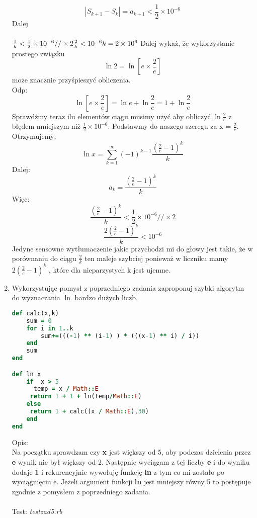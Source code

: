 \documentclass[fleqn]{article}
\begin{document}
\begin{enumerate}
   \[|S_{k+1} - S_{k}| = a_{k+1} < \frac{1}{2}\times 10^{-6}\]
   Dalej \\ \\ 
   $
   \frac{1}{k} <  \frac{1}{2}\times 10^{-6} // \times 2 \newline \newline
   \frac{2}{k} <  10^{-6} \\ \\
   k = 2 \times 10^{6} \\ \\
   $
   Dalej wykaż, że wykorzystanie prostego związku \[\ln 2 = \ln[e\times\frac{2}{e}]\] może znacznie przyśpieszyć obliczenia.
   \\Odp:
   \\
   \[\ln[e\times\frac{2}{e}] = \ln e + \ln \frac{2}{e} = 1 + \ln \frac{2}{e}\]
   Sprawdźmy teraz ilu elementów ciągu musimy użyć aby obliczyć $ \ln \frac{2}{e} $ z błędem mniejszym niż $\frac{1}{2}\times 10^{-6} $.
   Podstawmy do naszego szeregu za x = $ \frac{2}{e}  $. Otrzymujemy:\\
   \[\ln x = \sum_{k=1}^\infty(-1)^{k-1}\frac{(\frac{2}{e}-1)^k}{k}
\]
 Dalej:
 \[a_{k} = \frac{(\frac{2}{e}-1)^k}{k}\]
 Więc:
 \[ \frac{(\frac{2}{e}-1)^k}{k}< \frac{1}{2}\times 10^{-6} // \times 2\]
 \[ \frac{2(\frac{2}{e}-1)^k}{k}<10^{-6}\]
 Jedyne sensowne wytłumaczenie jakie przychodzi mi do głowy jest takie, że w porównaniu do ciągu  $ \frac{2}{k} $ ten maleje szybciej ponieważ w liczniku mamy $  2(\frac{2}{e}-1)^k $ , które dla nieparzystych k jest ujemne.
 \item Wykorzystując pomysł z poprzedniego zadania zaproponuj szybki algorytm do wyznaczania $ \ln $ bardzo dużych liczb.\\
 \begin{lstlisting}[language=Ruby, caption=Algorytm do wyznacznia logarytmu naturalnego]
def calc(x,k)
    sum = 0 
    for i in 1..k 
        sum+=(((-1) ** (i-1) ) * (((x-1) ** i) / i))
    end
    sum
end

def ln x
    if  x > 5
      temp = x / Math::E 
     return 1 + 1 + ln(temp/Math::E)
    else
     return 1 + calc((x / Math::E),30)
    end 
end

\end{lstlisting}
Opis:\\

Na początku sprawdzam czy \textbf{x} jest większy od 5, aby podczas dzielenia przez \textbf{e} wynik nie był większy od 2. Następnie wyciągam z tej liczby \textbf{e} i  do wyniku dodaje \textbf{1} i rekurencyjnie wywołuję funkcję \textbf{ln} z tym co mi zostało po wyciągnięciu e. Jeżeli argument funkcji \textbf{ln} jest mniejszy równy 5 to postępuje zgodnie z pomysłem z poprzedniego zadania.\\ \\
Test: \emph{testzad5.rb}\\


\end{enumerate}
\end{document}
